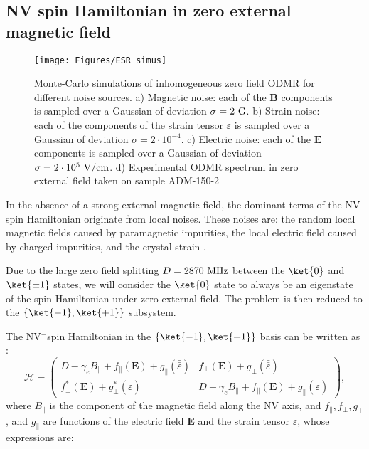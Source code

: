 \documentclass[a4paper,11pt]{report}
\begin{document}
\subsection{NV spin Hamiltonian in zero external magnetic field}
\label{sec. Hamltonian 0 B}
\begin{figure}[h]
\centering
\texttt{[image: Figures/ESR\_simus]}
\caption{Monte-Carlo simulations of inhomogeneous zero field ODMR for different noise sources. a) Magnetic noise: each of the $\mathbf{B}$ components is sampled over a Gaussian of deviation $\sigma=2\ \rm G$. b) Strain noise: each of the components of the strain tensor $\bar{\bar{\varepsilon}}$ is sampled over a Gaussian of deviation $\sigma=2\cdot 10^{-4}$. c) Electric noise: each of the $\mathbf{E}$ components is sampled over a Gaussian of deviation $\sigma=2\cdot 10^{5}\ \rm{V/cm}$. d) Experimental ODMR spectrum in zero external field taken on sample ADM-150-2}
\label{simus ESR}
\end{figure}

In the absence of a strong external magnetic field, the dominant terms of the NV spin Hamiltonian originate from local noises. These noises are: the random local magnetic fields caused by paramagnetic impurities, the local electric field caused by charged impurities, and the crystal strain \citep{doherty2012theory, udvarhelyi2018spin, mittiga2018imaging}. 

Due to the large zero field splitting $D=2870\ \rm MHz$ between the $\ket{0}$ and $\ket{\pm 1}$ states, we will consider the $\ket{0}$ state to always be an eigenstate of the spin Hamiltonian under zero external field. The problem is then reduced to the $\{ \ket{-1}, \ket{+1} \}$ subsystem.

The NV$^-$spin Hamiltonian in the $\{ \ket{-1}, \ket{+1} \}$ basis can be written as \citep{udvarhelyi2018spin}:
\begin{equation}
\mathcal{H}=\begin{pmatrix}
D-\gamma_e B_\parallel + f_\parallel(\mathbf{E}) + g_\parallel(\bar{\bar{\varepsilon}}) & f_\perp(\mathbf{E}) + g_\perp(\bar{\bar{\varepsilon}})\\
f^*_\perp(\mathbf{E}) + g^*_\perp(\bar{\bar{\varepsilon}})&D+\gamma_e B_\parallel + f_\parallel(\mathbf{E}) + g_\parallel(\bar{\bar{\varepsilon}})
\end{pmatrix},
\label{Hamiltonien pm1}
\end{equation}
where $B_\parallel$ is the component of the magnetic field along the NV axis, and $f_\parallel, f_\perp, g_\perp$, and $g_\parallel$ are functions of the electric field $\mathbf{E}$ and the strain tensor $\bar{\bar{\varepsilon}}$, whose expressions are:
\end{document}
